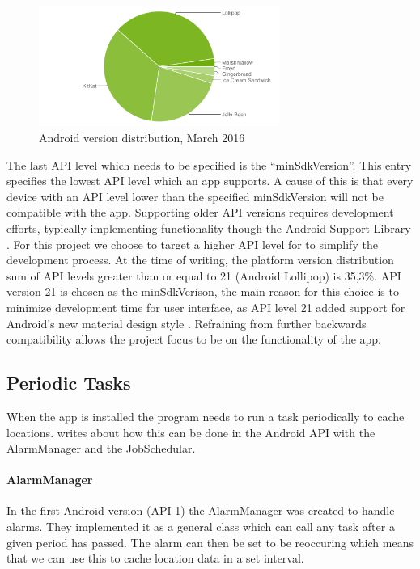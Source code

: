 \begin{figure}[h!]
	\centering
	\includegraphics[width=0.7\textwidth]{figures/android-chart-march.png}
	\caption{Android version distribution, March 2016 \cite{androidDashboard}}
	\label{fig:dashboard}
\end{figure}

The last API level which needs to be specified is the ``minSdkVersion''.
This entry specifies the lowest API level which an app supports.
A cause of this is that every device with an API level lower than the specified minSdkVersion will not be compatible with the app.
Supporting older API versions requires development efforts, typically implementing functionality though the Android Support Library \cite{androidSL}.
For this project we choose to target a higher API level for to simplify the development process.
At the time of writing, the platform version distribution sum of API levels greater than or equal to 21 (Android Lollipop) is 35,3\%.
API version 21 is chosen as the minSdkVerison, the main reason for this choice is to minimize development time for user interface, as API level 21 added support for Android's new material design style \cite{android5API}. Refraining from further backwards compatibility allows the project focus to be on the functionality of the app. 

\subsection{Periodic Tasks}\label{ssec:periodictasks}

When the app is installed the program needs to run a task periodically to cache locations.
 writes about how this can be done in the Android API with the AlarmManager and the JobSchedular.

\paragraph{AlarmManager}
In the first Android version (API 1) the AlarmManager was created to handle alarms.
They implemented it as a general class which can call any task after a given period has passed.
The alarm can then be set to be reoccuring which means that we can use this to cache location data in a set interval.

